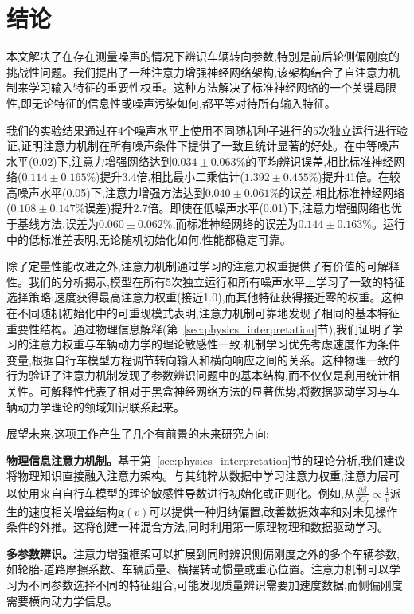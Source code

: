 \documentclass[Afour,sageh,times]{sagej}
\begin{document}
\section{结论}
\label{sec:conclusion}

本文解决了在存在测量噪声的情况下辨识车辆转向参数,特别是前后轮侧偏刚度的挑战性问题。我们提出了一种注意力增强神经网络架构,该架构结合了自注意力机制来学习输入特征的重要性权重。这种方法解决了标准神经网络的一个关键局限性,即无论特征的信息性或噪声污染如何,都平等对待所有输入特征。

我们的实验结果通过在4个噪声水平上使用不同随机种子进行的5次独立运行进行验证,证明注意力机制在所有噪声条件下提供了一致且统计显著的好处。在中等噪声水平(0.02)下,注意力增强网络达到$0.034 \pm 0.063$\%的平均辨识误差,相比标准神经网络($0.114 \pm 0.165$\%)提升3.4倍,相比最小二乘估计($1.392 \pm 0.455$\%)提升41倍。在较高噪声水平(0.05)下,注意力增强方法达到$0.040 \pm 0.061$\%的误差,相比标准神经网络($0.108 \pm 0.147$\%误差)提升2.7倍。即使在低噪声水平(0.01)下,注意力增强网络也优于基线方法,误差为$0.060 \pm 0.062$\%,而标准神经网络的误差为$0.144 \pm 0.163$\%。运行中的低标准差表明,无论随机初始化如何,性能都稳定可靠。

除了定量性能改进之外,注意力机制通过学习的注意力权重提供了有价值的可解释性。我们的分析揭示,模型在所有5次独立运行和所有噪声水平上学习了一致的特征选择策略:速度获得最高注意力权重(接近1.0),而其他特征获得接近零的权重。这种在不同随机初始化中的可重现模式表明,注意力机制可靠地发现了相同的基本特征重要性结构。通过物理信息解释(第~\ref{sec:physics_interpretation}节),我们证明了学习的注意力权重与车辆动力学的理论敏感性一致:机制学习优先考虑速度作为条件变量,根据自行车模型方程调节转向输入和横向响应之间的关系。这种物理一致的行为验证了注意力机制发现了参数辨识问题中的基本结构,而不仅仅是利用统计相关性。可解释性代表了相对于黑盒神经网络方法的显著优势,将数据驱动学习与车辆动力学理论的领域知识联系起来。

展望未来,这项工作产生了几个有前景的未来研究方向:

\textbf{物理信息注意力机制。}基于第~\ref{sec:physics_interpretation}节的理论分析,我们建议将物理知识直接融入注意力架构。与其纯粹从数据中学习注意力权重,注意力层可以使用来自自行车模型的理论敏感性导数进行初始化或正则化。例如,从$\frac{\partial \dot{\beta}}{\partial C_f} \propto \frac{1}{v}$派生的速度相关增益结构$\mathbf{g}(v)$可以提供一种归纳偏置,改善数据效率和对未见操作条件的外推。这将创建一种混合方法,同时利用第一原理物理和数据驱动学习。

\textbf{多参数辨识。}注意力增强框架可以扩展到同时辨识侧偏刚度之外的多个车辆参数,如轮胎-道路摩擦系数、车辆质量、横摆转动惯量或重心位置。注意力机制可以学习为不同参数选择不同的特征组合,可能发现质量辨识需要加速度数据,而侧偏刚度需要横向动力学信息。
\end{document}

